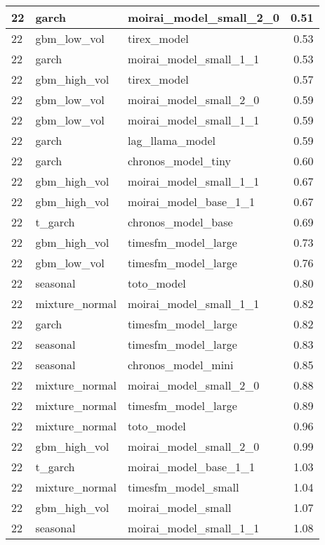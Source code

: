 {\begin{tabular}{lllr}
\midrule
22 & garch & moirai\_model\_small\_2\_0 & 0.51 \\
\midrule
22 & gbm\_low\_vol & tirex\_model & 0.53 \\
\midrule
22 & garch & moirai\_model\_small\_1\_1 & 0.53 \\
\midrule
22 & gbm\_high\_vol & tirex\_model & 0.57 \\
\midrule
22 & gbm\_low\_vol & moirai\_model\_small\_2\_0 & 0.59 \\
\midrule
22 & gbm\_low\_vol & moirai\_model\_small\_1\_1 & 0.59 \\
\midrule
22 & garch & lag\_llama\_model & 0.59 \\
\midrule
22 & garch & chronos\_model\_tiny & 0.60 \\
\midrule
22 & gbm\_high\_vol & moirai\_model\_small\_1\_1 & 0.67 \\
\midrule
22 & gbm\_high\_vol & moirai\_model\_base\_1\_1 & 0.67 \\
\midrule
22 & t\_garch & chronos\_model\_base & 0.69 \\
\midrule
22 & gbm\_high\_vol & timesfm\_model\_large & 0.73 \\
\midrule
22 & gbm\_low\_vol & timesfm\_model\_large & 0.76 \\
\midrule
22 & seasonal & toto\_model & 0.80 \\
\midrule
22 & mixture\_normal & moirai\_model\_small\_1\_1 & 0.82 \\
\midrule
22 & garch & timesfm\_model\_large & 0.82 \\
\midrule
22 & seasonal & timesfm\_model\_large & 0.83 \\
\midrule
22 & seasonal & chronos\_model\_mini & 0.85 \\
\midrule
22 & mixture\_normal & moirai\_model\_small\_2\_0 & 0.88 \\
\midrule
22 & mixture\_normal & timesfm\_model\_large & 0.89 \\
\midrule
22 & mixture\_normal & toto\_model & 0.96 \\
\midrule
22 & gbm\_high\_vol & moirai\_model\_small\_2\_0 & 0.99 \\
\midrule
22 & t\_garch & moirai\_model\_base\_1\_1 & 1.03 \\
\midrule
22 & mixture\_normal & timesfm\_model\_small & 1.04 \\
\midrule
22 & gbm\_high\_vol & moirai\_model\_small & 1.07 \\
\midrule
22 & seasonal & moirai\_model\_small\_1\_1 & 1.08 \\

\end{tabular}}
